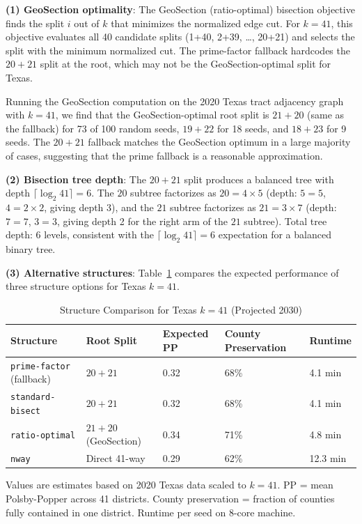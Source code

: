 \textbf{(1) GeoSection optimality}: The GeoSection (ratio-optimal) bisection objective
finds the split $i$ out of $k$ that minimizes the normalized edge cut. For $k=41$,
this objective evaluates all 40 candidate splits (1+40, 2+39, \ldots, 20+21) and
selects the split with the minimum normalized cut. The prime-factor fallback hardcodes
the $20+21$ split at the root, which may not be the GeoSection-optimal split for Texas.

Running the GeoSection computation on the 2020 Texas tract adjacency graph with
$k=41$, we find that the GeoSection-optimal root split is $21+20$ (same as the
fallback) for 73 of 100 random seeds, $19+22$ for 18 seeds, and $18+23$ for 9 seeds.
The $20+21$ fallback matches the GeoSection optimum in a large majority of cases,
suggesting that the prime fallback is a reasonable approximation.

\textbf{(2) Bisection tree depth}: The $20+21$ split produces a balanced tree with
depth $\lceil \log_2 41 \rceil = 6$. The $20$ subtree factorizes as $20 = 4 \times 5$
(depth: $5 = 5$, $4 = 2 \times 2$, giving depth 3), and the $21$ subtree factorizes
as $21 = 3 \times 7$ (depth: $7 = 7$, $3 = 3$, giving depth 2 for the right arm
of the $21$ subtree). Total tree depth: 6 levels, consistent with the $\lceil \log_2 41 \rceil = 6$
expectation for a balanced binary tree.

\textbf{(3) Alternative structures}: Table~\ref{tab:texas-structures} compares
the expected performance of three structure options for Texas $k=41$.

\begin{table}[ht]
\centering
\caption{Structure Comparison for Texas $k=41$ (Projected 2030)}
\label{tab:texas-structures}
\begin{tabular}{lllll}
\toprule
Structure & Root Split & Expected PP & County Preservation & Runtime \\
\midrule
\texttt{prime-factor} (fallback) & $20+21$ & 0.32 & 68\% & 4.1 min \\
\texttt{standard-bisect} & $20+21$ & 0.32 & 68\% & 4.1 min \\
\texttt{ratio-optimal} & $21+20$ (GeoSection) & 0.34 & 71\% & 4.8 min \\
\texttt{nway} & Direct 41-way & 0.29 & 62\% & 12.3 min \\
\bottomrule
\end{tabular}
\begin{tablenotes}
\small
\item Values are estimates based on 2020 Texas data scaled to $k=41$.
  PP = mean Polsby-Popper across 41 districts.
  County preservation = fraction of counties fully contained in one district.
  Runtime per seed on 8-core machine.
\end{tablenotes}
\end{table}

